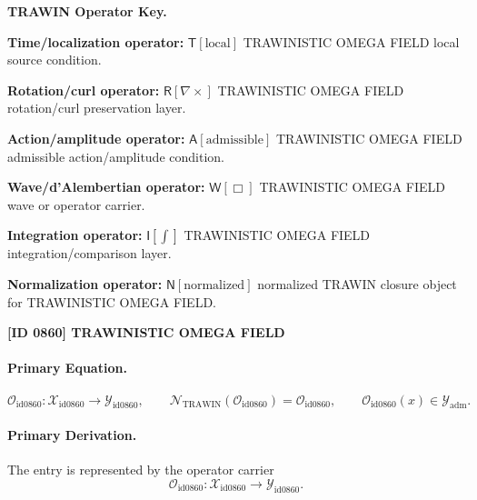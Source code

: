 \par\vspace{0.45\baselineskip}
\noindent\begin{minipage}[t]{\linewidth}
\begingroup
\small
\raggedright
\textbf{TRAWIN Operator Key.}\par
\noindent\textbf{Time/localization operator:} $\mathsf{T}\!\left[\mathrm{local}\right]$ TRAWINISTIC OMEGA FIELD local source condition.\par
\noindent\textbf{Rotation/curl operator:} $\mathsf{R}\!\left[\nabla\times\right]$ TRAWINISTIC OMEGA FIELD rotation/curl preservation layer.\par
\noindent\textbf{Action/amplitude operator:} $\mathsf{A}\!\left[\mathrm{admissible}\right]$ TRAWINISTIC OMEGA FIELD admissible action/amplitude condition.\par
\noindent\textbf{Wave/d'Alembertian operator:} $\mathsf{W}\!\left[\Box\right]$ TRAWINISTIC OMEGA FIELD wave or operator carrier.\par
\noindent\textbf{Integration operator:} $\mathsf{I}\!\left[\int\right]$ TRAWINISTIC OMEGA FIELD integration/comparison layer.\par
\noindent\textbf{Normalization operator:} $\mathsf{N}\!\left[\mathrm{normalized}\right]$ normalized TRAWIN closure object for TRAWINISTIC OMEGA FIELD.\par
\endgroup
\end{minipage}

\clearpage
\noindent\textbf{[ID 0860] TRAWINISTIC OMEGA FIELD}\par
\vspace{0.35em}
\paragraph{Primary Equation.}
\[
\mathcal{O}_{\mathrm{id0860}}:\mathcal{X}_{\mathrm{id0860}}\longrightarrow \mathcal{Y}_{\mathrm{id0860}},\qquad
\mathcal{N}_{\mathrm{TRAWIN}}(\mathcal{O}_{\mathrm{id0860}})=\mathcal{O}_{\mathrm{id0860}},\qquad
\mathcal{O}_{\mathrm{id0860}}(x)\in\mathcal{Y}_{\mathrm{adm}}.
\]

\paragraph{Primary Derivation.} The entry is represented by the operator carrier\[
\mathcal{O}_{\mathrm{id0860}}:\mathcal{X}_{\mathrm{id0860}}\longrightarrow \mathcal{Y}_{\mathrm{id0860}}.
\]

